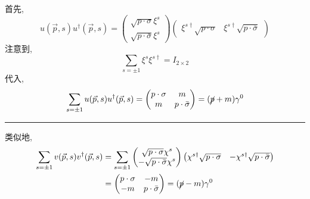 \begin{itemize}
	\begin{tcolorbox}[title=calculation:]
		首先,
		\begin{equation}
			u(\vec{p}, s) u^\dag(\vec{p}, s) = \begin{pmatrix}
				\sqrt{p \cdot \sigma} \xi^s \\
				\sqrt{p \cdot \bar{\sigma}} \xi^s
			\end{pmatrix} \begin{pmatrix}
				\xi^{s \dag} \sqrt{p \cdot \sigma} & \xi^{s \dag} \sqrt{p \cdot \bar{\sigma}}
			\end{pmatrix}
		\end{equation}
		注意到,
		\begin{equation}
			\sum_{s = \pm 1} \xi^{s} \xi^{s \dag} = I_{2 \times 2}
		\end{equation}
		代入,
		\begin{equation}
			\sum_{s = \pm 1} u(\vec{p}, s) u^\dag(\vec{p}, s) = \begin{pmatrix}
				p \cdot \sigma & m \\
				m & p \cdot \bar{\sigma}
			\end{pmatrix} = (\cancel{p} + m) \gamma^0
		\end{equation}
		
		\noindent\rule[0.5ex]{\linewidth}{0.5pt} %
		
		类似地,
		\begin{align}
			\sum_{s = \pm 1} v(\vec{p}, s) v^\dag(\vec{p}, s) &= \sum_{s = \pm 1} \begin{pmatrix}
				\sqrt{p \cdot \sigma} \chi^s \\
				- \sqrt{p \cdot \bar{\sigma}} \chi^s
			\end{pmatrix} \begin{pmatrix}
				\chi^{s \dag} \sqrt{p \cdot \sigma} & - \chi^{s \dag} \sqrt{p \cdot \bar{\sigma}}
			\end{pmatrix} \notag \\
			&= \begin{pmatrix}
				p \cdot \sigma & - m \\
				- m & p \cdot \bar{\sigma}
			\end{pmatrix} = (\cancel{p} - m) \gamma^0
		\end{align}
	\end{tcolorbox}
\end{itemize}

